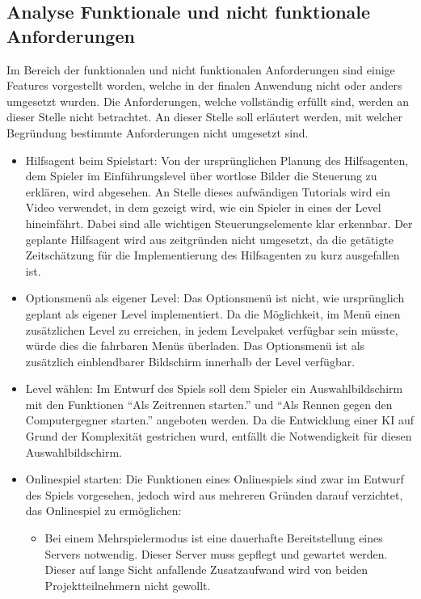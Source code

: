 \subsection{Analyse Funktionale und nicht funktionale Anforderungen}
Im Bereich der funktionalen und nicht funktionalen Anforderungen sind einige Features vorgestellt worden, welche in der finalen Anwendung nicht oder anders umgesetzt wurden. Die Anforderungen, welche vollständig erfüllt sind, werden an dieser Stelle nicht betrachtet. An dieser Stelle soll erläutert werden, mit welcher Begründung bestimmte Anforderungen nicht umgesetzt sind.
\begin{itemize}
    \item{Hilfsagent beim Spielstart: Von der ursprünglichen Planung des Hilfsagenten, dem Spieler im Einführungslevel über wortlose Bilder die Steuerung zu erklären, wird abgesehen. An Stelle dieses aufwändigen Tutorials wird ein Video verwendet, in dem gezeigt wird, wie ein Spieler in eines der Level hineinfährt. Dabei sind alle wichtigen Steuerungselemente klar erkennbar. Der geplante Hilfsagent wird aus zeitgründen nicht umgesetzt, da die getätigte Zeitschätzung für die Implementierung des Hilfsagenten zu kurz ausgefallen ist.}
    \item{Optionsmenü als eigener Level: Das Optionsmenü ist nicht, wie ursprünglich geplant als eigener Level implementiert. Da die Möglichkeit, im Menü einen zusätzlichen Level zu erreichen, in jedem Levelpaket verfügbar sein müsste, würde dies die fahrbaren Menüs überladen. Das Optionsmenü ist als zusätzlich einblendbarer Bildschirm innerhalb der Level verfügbar.}
    \item{Level wählen: Im Entwurf des Spiels soll dem Spieler ein Auswahlbildschirm mit den Funktionen \enquote{Als Zeitrennen starten.} und \enquote{Als Rennen gegen den Computergegner starten.} angeboten werden. Da die Entwicklung einer KI auf Grund der Komplexität gestrichen wurd, entfällt die Notwendigkeit für diesen Auswahlbildschirm.}
    \item{Onlinespiel starten: Die Funktionen eines Onlinespiels sind zwar im Entwurf des Spiels vorgesehen, jedoch wird aus mehreren Gründen darauf verzichtet, das Onlinespiel zu ermöglichen:}
    \begin{itemize}
        \item{Bei einem Mehrspielermodus ist eine dauerhafte Bereitstellung eines Servers notwendig. Dieser Server muss gepflegt und gewartet werden. Dieser auf lange Sicht anfallende Zusatzaufwand wird von beiden Projektteilnehmern nicht gewollt.}

\end{itemize}
\end{itemize}
